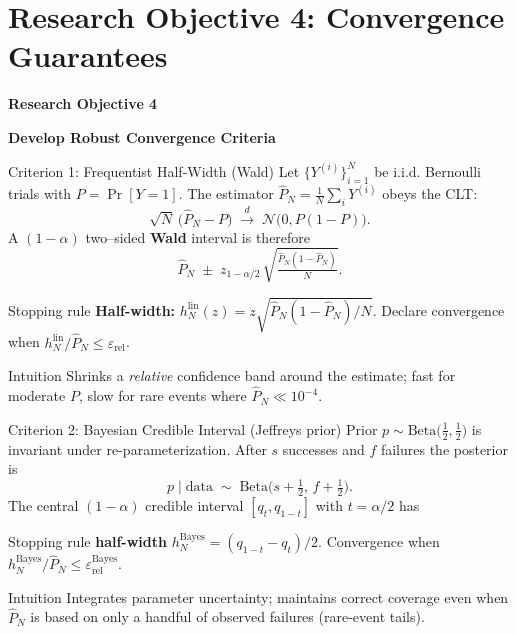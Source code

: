 
\section{Research Objective 4: Convergence Guarantees}
\begin{frame}
    \Large{\centerline{\textbf{Research Objective 4}}}
    \vspace{6pt}
    \large{\centerline{\textbf{Develop Robust Convergence Criteria}}}
\end{frame}

\begin{frame}{Criterion 1: Frequentist Half-Width (Wald)}
  \footnotesize
  Let $\{Y^{(i)}\}_{i=1}^N$ be i.i.d. Bernoulli trials with $P=\Pr[Y=1]$.  The estimator $\widehat P_N=\tfrac1N\sum_i Y^{(i)}$ obeys the CLT:
  \[\sqrt{N}\,\bigl(\widehat P_N-P\bigr) \;\xrightarrow{d}\; \mathcal N\bigl(0, P(1-P)\bigr).\]
  A $(1-\alpha)$ two–sided \textbf{Wald} interval is therefore
  \[ \widehat P_N \;\pm\; z_{1-\alpha/2}\, \sqrt{\tfrac{\widehat P_N(1-\widehat P_N)}{N}}. \]
  \begin{alertblock}{Stopping rule}
   \textbf{Half-width:} $h_N^{\text{lin}}(z)=z\sqrt{\widehat P_N(1-\widehat P_N)/N}.$ Declare convergence when $h_N^{\text{lin}}/\widehat P_N\le \varepsilon_{\text{rel}}$.
  \end{alertblock}
  \begin{block}{Intuition}
    Shrinks a \emph{relative} confidence band around the estimate; fast for moderate $P$, slow for rare events where $\widehat P_N\ll10^{-4}$.
  \end{block}
\end{frame}

\begin{frame}{Criterion 2: Bayesian Credible Interval (Jeffreys prior)}
  \footnotesize
  Prior $p\sim\text{Beta}\bigl(\tfrac12,\tfrac12\bigr)$ is invariant under re-parameterization.  After $s$ successes and $f$ failures the posterior is
  \[ p\mid\text{data}\;\sim\; \text{Beta}\bigl(s+\tfrac12,\,f+\tfrac12\bigr). \]
  The central $(1-\alpha)$ credible interval $[q_t,q_{1-t}]$ with $t=\alpha/2$ has
  \begin{alertblock}{Stopping rule}
  \textbf{half-width} $h_N^{\text{Bayes}}=(q_{1-t}-q_t)/2$. Convergence when $h_N^{\text{Bayes}}/\widehat P_N\le \varepsilon_{\text{rel}}^{\text{Bayes}}$.
  \end{alertblock}
  \begin{block}{Intuition}
  Integrates parameter uncertainty; maintains correct coverage even when $\widehat P_N$ is based on only a handful of observed failures (rare-event tails).
  \end{block}
\end{frame}


